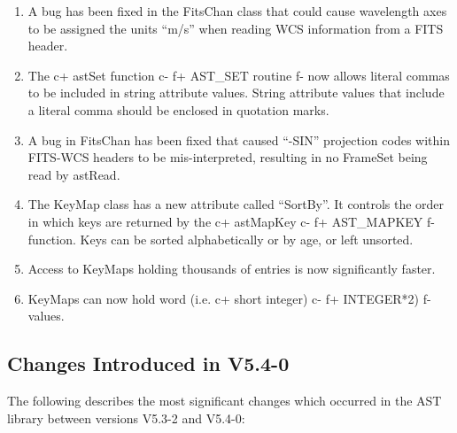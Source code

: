 \documentclass[twoside,11pt]{starlink}
\begin{document}
\begin{enumerate}

\item A bug has been fixed in the FitsChan class that could cause wavelength
axes to be assigned the units ``m/s'' when reading WCS information from a
FITS header.

\item The
c+
astSet function
c-
f+
AST\_SET routine
f-
now allows literal commas to be included in string attribute values. String
attribute values that include a literal comma should be enclosed in quotation
marks.

\item A bug in FitsChan has been fixed that caused ``-SIN'' projection
codes within FITS-WCS headers to be mis-interpreted, resulting in no
FrameSet being read by astRead.

\item The KeyMap class has a new attribute called ``SortBy''. It controls
the order in which keys are returned by the
c+
astMapKey
c-
f+
AST\_MAPKEY
f-
function. Keys can be sorted alphabetically or by age, or left unsorted.

\item Access to KeyMaps holding thousands of entries is now significantly
faster.

\item KeyMaps can now hold word (i.e.
c+
short integer)
c-
f+
INTEGER*2)
f-
values.

\end{enumerate}


\subsection{Changes Introduced in V5.4-0}

The following describes the most significant changes which
occurred in the AST library between versions V5.3-2 and V5.4-0:
\end{document}
